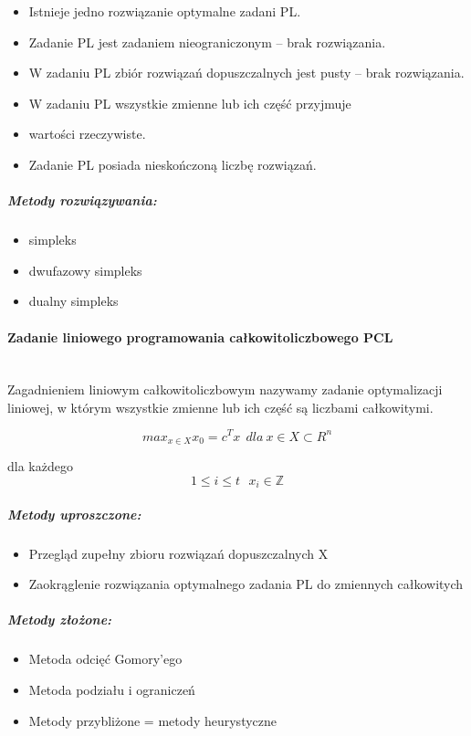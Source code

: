 \documentclass[a4paper,twoside]{report}
\begin{document}
\begin{itemize}
\item Istnieje jedno rozwiązanie optymalne zadani PL.
\item Zadanie PL jest zadaniem nieograniczonym – brak rozwiązania.
\item W zadaniu PL zbiór rozwiązań dopuszczalnych jest pusty – brak
rozwiązania.
\item W zadaniu PL wszystkie zmienne lub ich część przyjmuje
\item wartości rzeczywiste.
\item Zadanie PL posiada nieskończoną liczbę rozwiązań.
\end{itemize}
 
\subparagraph{Metody rozwiązywania:}
\begin{itemize}
\item simpleks
\item dwufazowy simpleks
\item dualny simpleks
\end{itemize} 
 
\paragraph{Zadanie liniowego programowania całkowitoliczbowego PCL\\\\}

Zagadnieniem liniowym całkowitoliczbowym nazywamy zadanie optymalizacji
liniowej, w którym wszystkie zmienne lub ich część są liczbami całkowitymi.

\[max_{x \in X} x_0 = c^Tx~~dla~x \in X \subset R^n\]


dla każdego $$1 \le i \le t~~~x_i \in \mathbb{Z}$$

\subparagraph{Metody uproszczone:}
\begin{itemize}
\item Przegląd zupełny zbioru rozwiązań dopuszczalnych X
\item Zaokrąglenie rozwiązania optymalnego zadania PL do zmiennych całkowitych
\end{itemize}

\subparagraph{Metody złożone:}
\begin{itemize}
\item Metoda odcięć Gomory'ego
\item Metoda podziału i ograniczeń
\item Metody przybliżone = metody heurystyczne
\end{itemize}
\end{document}
